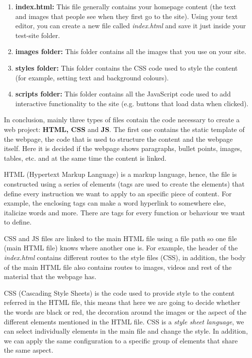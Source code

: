 \begin{enumerate}[nosep]
    \item \textbf{index.html:} This file generally contains your homepage content (the text and images that people see when they first go to the site). Using your text editor, you can create a new file called \textit{index.html} and save it just inside your test-site folder.
    \item \textbf{images folder:} This folder contains all the images that you use on your site.
    \item \textbf{styles folder:} This folder contains the CSS code used to style the content (for example, setting text and background colours).
    \item \textbf{scripts folder:} This folder contains all the JavaScript code used to add interactive functionality to the site (e.g. buttons that load data when clicked).    
\end{enumerate}

In conclusion, mainly three types of files contain the code necessary to create a web project: \textbf{HTML, CSS} and \textbf{JS}. The first one contains the static template of the webpage, the code that is used to structure the content and the webpage itself. Here it is decided if the webpage shows paragraphs, bullet points, images, tables, etc. and at the same time the content is linked. 

HTML (Hypertext Markup Language) is a markup language, hence, the file is constructed using a series of elements (tags are used to create the elements) that define every instruction we want to apply to an specific piece of content. For example, the enclosing tags can make a word hyperlink to somewhere else, italicize words and more. There are tags for every function or behaviour we want to define.

CSS and JS files are linked to the main HTML file using a file path so one file (main HTML file) knows where another one is. For example, the header of the \textit{index.html} contains different routes to the style files (CSS), in addition, the body of the main HTML file also contains routes to images, videos and rest of the material that the webpage has. 

CSS (Cascading Style Sheets) is the code used to provide style to the content referred in the HTML file, this means that here we are going to decide whether the words are black or red, the decoration around the images or the aspect of the different elements mentioned in the HTML file. CSS is a \textit{style sheet language}, we can select individually elements in the main file and change the style. In addition, we can apply the same configuration to a specific group of elements that share the same aspect. 


